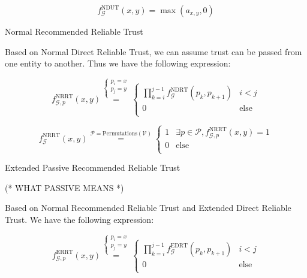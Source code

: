 \documentclass{article}
\begin{document}
\begin{equation}
f_{\mathcal{G}}^{\text{NDUT}}(x,y)=\max \left(a_{x,y},0\right)
\end{equation}

Normal Recommended Reliable Trust

Based on Normal Direct Reliable Trust, we can assume trust can be passed from one entity to another. Thus we have the following expression:

\begin{equation}
f_{\mathcal{G},\mathit{p}}^{\text{NRRT}}(x,y)\overset{\left\{
\begin{array}{c}
 \mathit{p}_i=x \\
 \mathit{p}_j=y \\
\end{array}
\right.}{=}\left\{
\begin{array}{cc}
 \prod _{k=i}^{j-1} f_{\mathcal{G}}^{\text{NDRT}}\left(\mathit{p}_k,p_{k+1}\right) & i<j \\
 0 & \text{else} \\
\end{array}
\right.
\end{equation}

\begin{equation}
f_{\mathcal{G}}^{\text{NRRT}}(x,y)\overset{\mathcal{P}=\text{Permutations}(\mathcal{V})}{=}\left\{
\begin{array}{cc}
 1 & \exists \mathit{p}\in \mathcal{P},f_{\mathcal{G},\mathit{p}}^{\text{NRRT}}(x,y)=1 \\
 0 & \text{else} \\
\end{array}
\right.
\end{equation}

Extended Passive Recommended Reliable Trust

(* WHAT PASSIVE MEANS *)

Based on Normal Recommended Reliable Trust and Extended Direct Reliable Trust. We have the following expression:

\begin{equation}
f_{\mathcal{G},\mathit{p}}^{\text{ERRT}}(x,y)\overset{\left\{
\begin{array}{c}
 \mathit{p}_i=x \\
 \mathit{p}_j=y \\
\end{array}
\right.}{=}\left\{
\begin{array}{cc}
 \prod _{k=i}^{j-1} f_{\mathcal{G}}^{\text{EDRT}}\left(\mathit{p}_k,p_{k+1}\right) & i<j \\
 0 & \text{else} \\
\end{array}
\right.
\end{equation}
\end{document}
